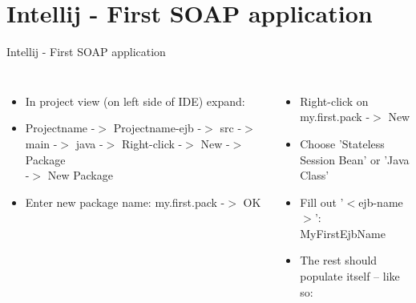 \documentclass[aspectratio=1610,english]{beamer} %
\begin{document}
	\section{Intellij - First SOAP application}
	\begin{frame}[fragile]{Intellij - First SOAP application}
		\begin{columns}
				\begin{itemize}
					\tiny
					\color{black}
					\item In project view (on left side of IDE) expand: 
					\item Project\textunderscore name -$>$ Project\textunderscore name-ejb -$>$ src -$>$ main -$>$ java -$>$ Right-click -$>$ New -$>$ Package \\ -$>$ New Package
					\item Enter new package name: my.first.pack -$>$ OK
				\end{itemize}
				\begin{itemize}
					\tiny
					\color{black}
					\item Right-click on my.first.pack -$>$ New 
					\item Choose 'Stateless Session Bean' or 'Java Class'
					\item Fill out '$<$ejb-name$>$': MyFirstEjbName
					\item The rest should populate itself – like so:
				\end{itemize}
				\fontsize{4}{5} \selectfont
				

\end{columns}
\end{frame}
\end{document}
